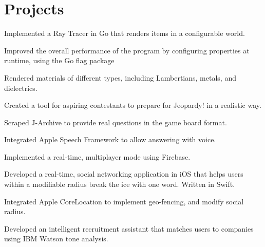 \documentclass[]{deedy-resume-openfont}
\begin{document}
\begin{minipage}[t]{0.66\textwidth}
\section{Projects}
\begin{tightemize}
\item Implemented a Ray Tracer in Go that renders items in a configurable world.
\item Improved the overall performance of the program by configuring properties at runtime, using the Go flag package
\item Rendered materials of different types, including Lambertians, metals, and dielectrics.
\end{tightemize}
\sectionsep

\begin{tightemize}
\item Created a tool for aspiring contestants to prepare for Jeopardy! in a realistic way.
\item Scraped J-Archive to provide real questions in the game board format.
\item Integrated Apple Speech Framework to allow answering with voice.
\item Implemented a real-time, multiplayer mode using Firebase.
\end{tightemize}
\sectionsep

\begin{tightemize}
\item Developed a real-time, social networking application in iOS that helps users within a modifiable radius break the ice with one word. Written in Swift.
\item Integrated Apple CoreLocation to implement geo-fencing, and modify social radius.
\end{tightemize}

\sectionsep

\begin{tightemize}
\item Developed an intelligent recruitment assistant that matches users to companies using IBM Watson tone analysis.

\end{tightemize}
\sectionsep


\end{minipage} 
\end{document}
